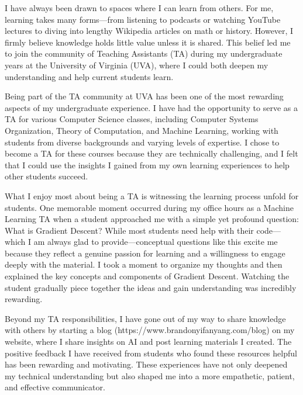 \documentclass[10pt]{article}
\begin{document}
I have always been drawn to spaces where I can learn from others. For me, learning takes many forms—from listening to podcasts or watching YouTube lectures to diving into lengthy Wikipedia articles on math or history. However, I firmly believe knowledge holds little value unless it is shared. This belief led me to join the community of Teaching Assistants (TA) during my undergraduate years at the University of Virginia (UVA), where I could both deepen my understanding and help current students learn.

Being part of the TA community at UVA has been one of the most rewarding aspects of my undergraduate experience. I have had the opportunity to serve as a TA for various Computer Science classes, including Computer Systems Organization, Theory of Computation, and Machine Learning, working with students from diverse backgrounds and varying levels of expertise. I chose to become a TA for these courses because they are technically challenging, and I felt that I could use the insights I gained from my own learning experiences to help other students succeed.

What I enjoy most about being a TA is witnessing the learning process unfold for students. One memorable moment occurred during my office hours as a Machine Learning TA when a student approached me with a simple yet profound question: What is Gradient Descent? While most students need help with their code—which I am always glad to provide—conceptual questions like this excite me because they reflect a genuine passion for learning and a willingness to engage deeply with the material. I took a moment to organize my thoughts and then explained the key concepts and components of Gradient Descent. Watching the student gradually piece together the ideas and gain understanding was incredibly rewarding.

Beyond my TA responsibilities, I have gone out of my way to share knowledge with others by starting a blog (https://www.brandonyifanyang.com/blog) on my website, where I share insights on AI and post learning materials I created. The positive feedback I have received from students who found these resources helpful has been rewarding and motivating. These experiences have not only deepened my technical understanding but also shaped me into a more empathetic, patient, and effective communicator.
\end{document}
